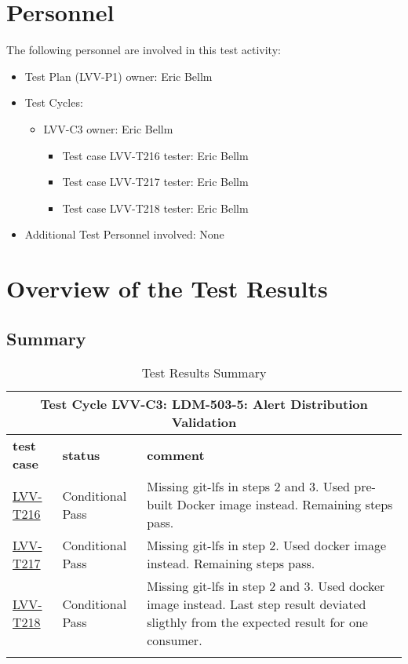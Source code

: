 \documentclass[DM,lsstdraft,STR,toc]{lsstdoc}
\begin{document}
\section{Personnel}
\label{sect:personnel}

The following personnel are involved in this test activity:

\begin{itemize}
\item Test Plan (LVV-P1) owner: Eric Bellm
\item Test Cycles:
\begin{itemize}
  \item LVV-C3 owner: 
    Eric Bellm
  \begin{itemize}
    \item Test case LVV-T216 tester: Eric Bellm
    \item Test case LVV-T217 tester: Eric Bellm
    \item Test case LVV-T218 tester: Eric Bellm
  \end{itemize}
\end{itemize}
\item Additional Test Personnel involved: None
\end{itemize}

\newpage

\section{Overview of the Test Results}
\label{sect:overview}

\subsection{Summary}
\label{sect:summarytable}

\begin{longtable} {p{}p{}p{}}
\toprule
  \multicolumn{3}{c}{ Test Cycle {\bf LVV-C3: LDM-503-5: Alert Distribution Validation }} \\\hline
  {\bf \footnotesize test case} & {\bf \footnotesize status} & {\bf \footnotesize comment} \\\toprule
    \href{https://jira.lsstcorp.org/secure/Tests.jspa#/testCase/LVV-T216}{LVV-T216} 
    & Conditional Pass & Missing git-lfs in steps 2 and 3. Used pre-built Docker image instead.
Remaining steps pass.

    \\\hline
    \href{https://jira.lsstcorp.org/secure/Tests.jspa#/testCase/LVV-T217}{LVV-T217} 
    & Conditional Pass & Missing git-lfs in step 2. Used docker image instead. Remaining steps
pass.

    \\\hline
    \href{https://jira.lsstcorp.org/secure/Tests.jspa#/testCase/LVV-T218}{LVV-T218} 
    & Conditional Pass & Missing git-lfs in step 2 and 3. Used docker image instead. Last step
result deviated sligthly from the expected result for one consumer.

    \\\hline

\caption{Test Results Summary}
\label{table:summary}
\end{longtable}
\end{document}
